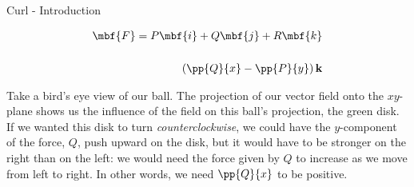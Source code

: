 \documentclass[11pt,english,
handout
]{beamer}
\begin{document}
\begin{frame}[t]{Curl - Introduction}
\small

\begin{minipage}{0.5\textwidth}
\begin{align*}
\mbf{F}=P\mbf{i}+Q\mbf{j}+R\mbf{k}\\[5mm]
\left(\pp{Q}{x}-\pp{P}{y}\right)\mathbf{k}
\end{align*}
\end{minipage}%
\begin{minipage}{0.5\textwidth}
\centering
{}
\end{minipage}

\lspace
Take a bird's eye view of our ball. The projection of our vector field onto the $xy$-plane shows us the influence of the field on this ball's projection, the green disk. \pause If we wanted this disk to turn \textit{counterclockwise}, we could have the $y$-component of the force, $Q$, push upward on the disk, but it would have to be stronger on the right than on the left: we would need the force given by $Q$ to increase as we move from left to right. In other words, we need $\pp{Q}{x}$ to be positive.
\end{frame}
\end{document}
